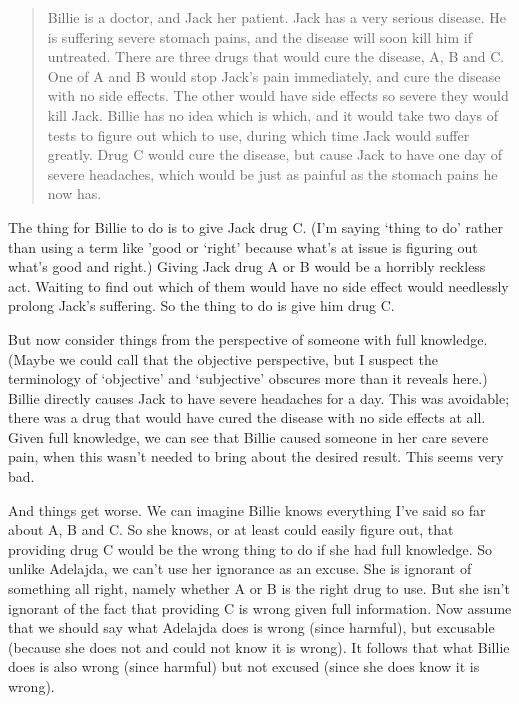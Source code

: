 \begin{quote}
\gls{Billie} is a doctor, and \gls{Jack} her patient. \gls{Jack} has a very serious disease. He is suffering severe stomach pains, and the disease will soon kill him if untreated. There are three drugs that would cure the disease, A, B and C. One of A and B would stop \gls{Jack}'s pain immediately, and cure the disease with no side effects. The other would have side effects so severe they would kill \gls{Jack}. \gls{Billie} has no idea which is which, and it would take two days of tests to figure out which to use, during which time \gls{Jack} would suffer greatly. Drug C would cure the disease, but cause \gls{Jack} to have one day of severe headaches, which would be just as painful as the stomach pains he now has.
\end{quote}
The thing for \gls{Billie} to do is to give \gls{Jack} drug C. (I'm saying `thing to do' rather than using a term like 'good or `right' because what's at issue is figuring out what's good and right.) Giving \gls{Jack} drug A or B would be a horribly reckless act. Waiting to find out which of them would have no side effect would needlessly prolong \gls{Jack}'s suffering. So the thing to do is give him drug C.

But now consider things from the perspective of someone with full knowledge. (Maybe we could call that the objective perspective, but I suspect the terminology of `objective' and `subjective' obscures more than it reveals here.) \gls{Billie} directly causes \gls{Jack} to have severe headaches for a day. This was avoidable; there was a drug that would have cured the disease with no side effects at all. Given full knowledge, we can see that \gls{Billie} caused someone in her care severe pain, when this wasn't needed to bring about the desired result. This seems very bad.

And things get worse. We can imagine \gls{Billie} knows everything I've said so far about A, B and C. So she knows, or at least could easily figure out, that providing drug C would be the wrong thing to do if she had full knowledge. So unlike \gls{Adelajda}, we can't use her ignorance as an excuse. She is ignorant of something all right, namely whether A or B is the right drug to use. But she isn't ignorant of the fact that providing C is wrong given full information. Now assume that we should say what \gls{Adelajda} does is wrong (since harmful), but excusable (because she does not and could not know it is wrong). It follows that what \gls{Billie} does is also wrong (since harmful) but not excused (since she does know it is wrong).


